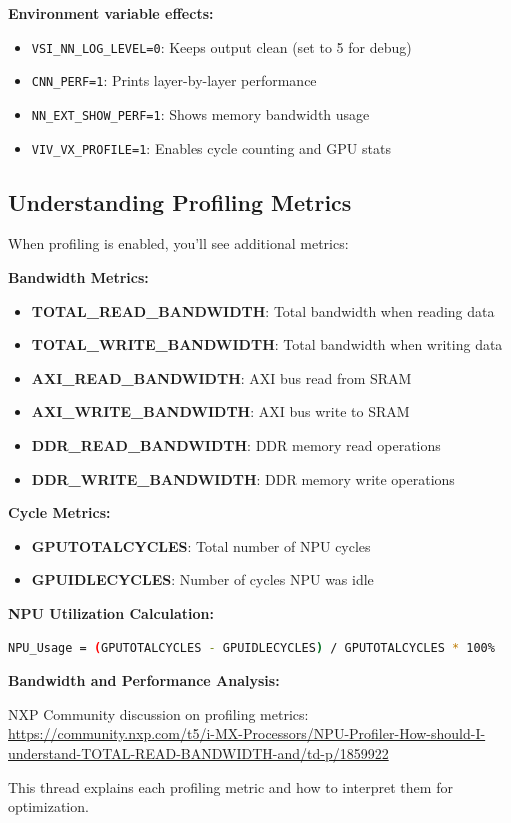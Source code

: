 \documentclass[12pt,a4paper]{report}
\begin{document}
\textbf{Environment variable effects:}
\begin{itemize}
    \item \texttt{VSI\_NN\_LOG\_LEVEL=0}: Keeps output clean (set to 5 for debug)
    \item \texttt{CNN\_PERF=1}: Prints layer-by-layer performance
    \item \texttt{NN\_EXT\_SHOW\_PERF=1}: Shows memory bandwidth usage
    \item \texttt{VIV\_VX\_PROFILE=1}: Enables cycle counting and GPU stats
\end{itemize}

\subsection{Understanding Profiling Metrics}

When profiling is enabled, you'll see additional metrics:

\textbf{Bandwidth Metrics:}
\begin{itemize}
    \item \textbf{TOTAL\_READ\_BANDWIDTH}: Total bandwidth when reading data
    \item \textbf{TOTAL\_WRITE\_BANDWIDTH}: Total bandwidth when writing data
    \item \textbf{AXI\_READ\_BANDWIDTH}: AXI bus read from SRAM
    \item \textbf{AXI\_WRITE\_BANDWIDTH}: AXI bus write to SRAM
    \item \textbf{DDR\_READ\_BANDWIDTH}: DDR memory read operations
    \item \textbf{DDR\_WRITE\_BANDWIDTH}: DDR memory write operations
\end{itemize}

\textbf{Cycle Metrics:}
\begin{itemize}
    \item \textbf{GPUTOTALCYCLES}: Total number of NPU cycles
    \item \textbf{GPUIDLECYCLES}: Number of cycles NPU was idle
\end{itemize}

\textbf{NPU Utilization Calculation:}
\begin{lstlisting}[language=bash]
NPU_Usage = (GPUTOTALCYCLES - GPUIDLECYCLES) / GPUTOTALCYCLES * 100%
\end{lstlisting}

\begin{docref}
\textbf{Bandwidth and Performance Analysis:}

NXP Community discussion on profiling metrics:
\url{https://community.nxp.com/t5/i-MX-Processors/NPU-Profiler-How-should-I-understand-TOTAL-READ-BANDWIDTH-and/td-p/1859922}

This thread explains each profiling metric and how to interpret them for optimization.
\end{docref}
\end{document}
